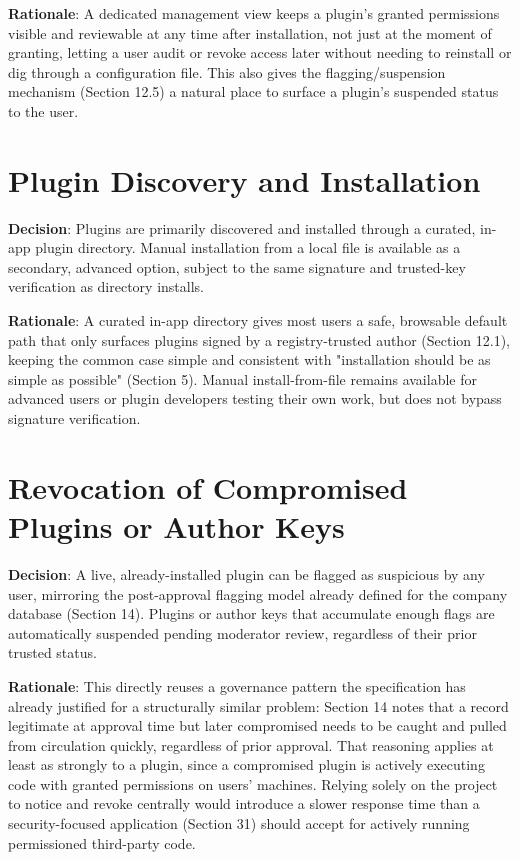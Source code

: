 \textbf{Rationale}: A dedicated management view keeps a plugin's granted permissions visible and reviewable at any time after installation, not just at the moment of granting, letting a user audit or revoke access later without needing to reinstall or dig through a configuration file. This also gives the flagging/suspension mechanism (Section 12.5) a natural place to surface a plugin's suspended status to the user.
\section{Plugin Discovery and Installation}
\textbf{Decision}: Plugins are primarily discovered and installed through a curated, in-app plugin directory. Manual installation from a local file is available as a secondary, advanced option, subject to the same signature and trusted-key verification as directory installs.

\textbf{Rationale}: A curated in-app directory gives most users a safe, browsable default path that only surfaces plugins signed by a registry-trusted author (Section 12.1), keeping the common case simple and consistent with "installation should be as simple as possible" (Section 5). Manual install-from-file remains available for advanced users or plugin developers testing their own work, but does not bypass signature verification.
\section{Revocation of Compromised Plugins or Author Keys}
\textbf{Decision}: A live, already-installed plugin can be flagged as suspicious by any user, mirroring the post-approval flagging model already defined for the company database (Section 14). Plugins or author keys that accumulate enough flags are automatically suspended pending moderator review, regardless of their prior trusted status.

\textbf{Rationale}: This directly reuses a governance pattern the specification has already justified for a structurally similar problem: Section 14 notes that a record legitimate at approval time but later compromised needs to be caught and pulled from circulation quickly, regardless of prior approval. That reasoning applies at least as strongly to a plugin, since a compromised plugin is actively executing code with granted permissions on users' machines. Relying solely on the project to notice and revoke centrally would introduce a slower response time than a security-focused application (Section 31) should accept for actively running permissioned third-party code.
